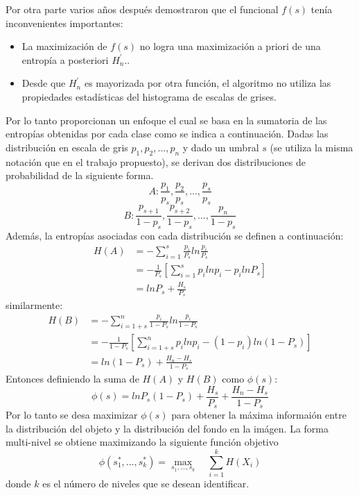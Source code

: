 \documentclass[preprint,12pt]{elsarticle}
\begin{document}
Por otra parte varios años después \citet{kapur1985new} demostraron que el funcional $f(s)$ tenía inconvenientes importantes:
\begin{itemize}
    \item La maximización de $f(s)$ no logra una maximización a priori de una entropía a posteriori $H^\prime_n$..
    \item Desde que $H^\prime_n$ es mayorizada por otra función, el algoritmo no utiliza las propiedades estadísticas del histograma de escalas de grises.
\end{itemize}
%
Por lo tanto \citet{kapur1985new} proporcionan un enfoque el cual se basa en la sumatoria de las entropías obtenidas por cada clase como se indica a continuación.
%
Dadas las distribución en escala de gris $p_1, p_2, ..., p_n$ y dado un umbral $s$ (se utiliza la misma notación que en el trabajo propuesto), se derivan dos distribuciones de probabilidad de la siguiente forma.
\begin{equation}
    A: \frac{p_1}{p_s}, \frac{p_2}{p_s}, ..., \frac{p_s}{p_s}
\end{equation}
\begin{equation}
    B: \frac{p_{s+1}}{1-p_s}, \frac{p_{s+2}}{1-p_s}, ..., \frac{p_{n}}{1-p_s}
\end{equation}
Además, la entropías asociadas con cada distribución se definen a continuación:
\begin{equation}
   \begin{split}
    H(A) &= - \sum_{i=1}^s \frac{p_i}{P_s} ln\frac{p_i}{P_s} \\
    &= -\frac{1}{P_s} \left [ \sum_{i=1}^s p_i ln p_i - p_i ln P_s  \right ] \\
    &= ln P_s + \frac{H_s}{P_s}
   \end{split}
\end{equation}
similarmente:
\begin{equation}
   \begin{split}
    H(B) &= - \sum_{i=1+s}^n \frac{p_i}{1-P_s} ln\frac{p_i}{1-P_s} \\
    &= -\frac{1}{1-P_s} \left [ \sum_{i=1+s}^n p_i ln p_i - (1-p_i) ln(1-P_s)  \right ] \\
    &= ln (1-P_s) + \frac{H_n - H_s}{1-P_s}
   \end{split}
\end{equation}
Entonces definiendo la suma de $H(A)$ y $H(B)$ como $\phi(s)$:
\begin{equation}
    \phi(s) = ln P_s (1-P_s) + \frac{H_s}{P_s} + \frac{H_n - H_s}{1-P_s}
\end{equation}
Por lo tanto se desa maximizar $\phi(s)$ para obtener la máxima informaión entre la distribución del objeto y la distribución del fondo en la imágen.
%
La forma multi-nivel se obtiene maximizando la siguiente función objetivo
\begin{equation}
    \phi(s_1^*, ..., s_k^*) = \max_{s_1,...,s_k} \quad \sum_{i=1}^k H(X_i)
\end{equation}
donde $k$ es el número de niveles que se desean identificar.
\end{document}
